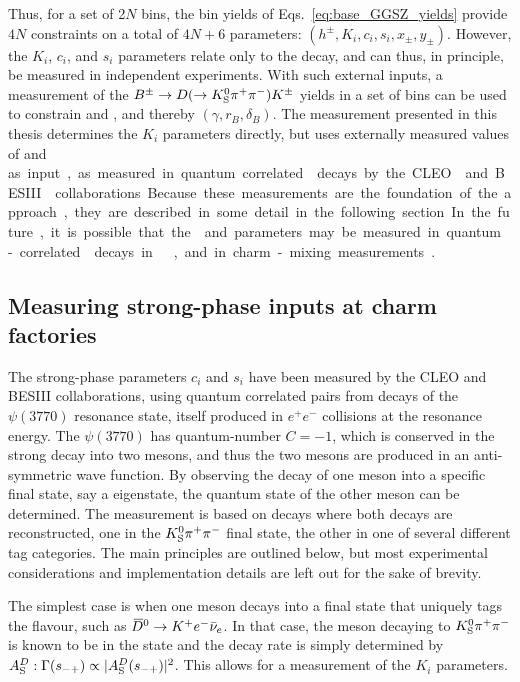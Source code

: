 
Thus, for a set of 2$N$ bins, the bin yields of Eqs.~\eqref{eq:base_GGSZ_yields} provide $4N$ constraints on a total of $4N+6$  parameters: $(h^\pm, K_i, c_i, s_i, x_\pm, y_\pm)$. However, the $K_i$, $c_i$, and $s_i$ parameters relate only to the \D decay, and can thus, in principle, be measured in independent experiments. With such external inputs, a measurement of the ${{B}^\pm}\rightarrow D(\rightarrow{\ensuremath{{K}^0_{\mathrm{S}}}}{\ensuremath{{\pi}^+}}{\ensuremath{{\pi}^-}}){{K}^\pm}$ yields in a set of bins can be used to constrain \xpm and \ypm, and thereby $(\gamma, r_B, \delta_B)$. The measurement presented in this thesis determines the $K_i$ parameters directly, but uses externally measured values of \ci and \si as input, as measured in quantum correlated \D decays by the CLEO~\cite{CLEOCISI} and BESIII~\cite{BESCISI} collaborations. Because these measurements are the foundation of the approach, they are described in some detail in the following section. In the future, it is possible that the \ci and \si parameters may be measured in quantum-correlated \D decays in \lhcb~\cite{LHCb-PAPER-2019-005}, and in charm-mixing measurements~\cite{thomasModelindependentOverlineDMixing2012}.

\subsection{Measuring strong-phase inputs at charm factories} %
\label{sub:measuring_strong_phase_inputs_at_charm_factories}

The strong-phase parameters $c_i$ and $s_i$ have been measured by the CLEO and BESIII collaborations, using quantum correlated \Dz\Dzb pairs from decays of the $\psi(3770)$ resonance state, itself produced in $e^+e^-$ collisions at the resonance energy. The $\psi(3770)$ has quantum-number $C=-1$, which is conserved in the strong decay into two \D mesons, and thus the two \D mesons are produced in an anti-symmetric wave function. By observing the decay of one \D meson into a specific final state, say a \CP eigenstate, the quantum state of the other \D meson can be determined. The measurement is based on decays where both \D decays are reconstructed, one in the ${{K}^0_{\mathrm{S}}}{{\pi}^+}{{\pi}^-}$ final state, the other in one of several different tag categories. The main principles are outlined below, but most experimental considerations and implementation details are left out for the sake of brevity.

The simplest case is when one \D meson decays into a final state that uniquely tags the flavour, such as ${{\kern 0.18em\overline{\kern -0.18em D}}{}^0}\rightarrow{\ensuremath{{K}^+}} e^-\bar\nu_e$. In that case, the \D meson decaying to ${{K}^0_{\mathrm{S}}}{{\pi}^+}{{\pi}^-}$ is known to be in the \Dz state and the decay rate is simply determined by $A_{\rm S}^{D}: \Gamma(s_{-+})\propto |A_{\rm S}^{D}(s_{-+})|^2$. This allows for a measurement of the $K_i$ parameters.


